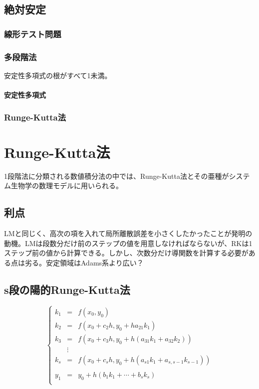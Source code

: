 \subsection{絶対安定}
\subsubsection{線形テスト問題}

\subsubsection{多段階法}
安定性多項式の根がすべて1未満。
\paragraph{安定性多項式}
\subsubsection{Runge-Kutta法}




\section{Runge-Kutta法}
1段階法に分類される数値積分法の中では、Runge-Kutta法とその亜種がシステム生物学の数理モデルに用いられる。
\subsection{利点}
LMと同じく、高次の項を入れて局所離散誤差を小さくしたかったことが発明の動機。LMは段数分だけ前のステップの値を用意しなければならないが、RKは1ステップ前の値から計算できる。しかし、次数分だけ導関数を計算する必要がある点は劣る。安定領域はAdams系より広い？

\subsection{s段の陽的Runge-Kutta法}
\[
\left\{
\begin{array}{lcl}
k_1 & = & f( x_0 , y_0 )\\
k_2 & = & f( x_0 + c_2 h , y_0 + h a_{21}k_1 )\\
k_3 & = & f( x_0 + c_3 h , y_0 + h ( a_{31}k_1 + a_{32} k_2 ))\\
    & \vdots  & \\
k_s & = & f( x_0 + c_s h , y_0 + h ( a_{s1}k_1 + a_{s,s-1} k_{s-1}))\\
 & & \\
y_1 & = & y_0 + h(b_1 k_1 + \cdots + b_s k_s)\\
\end{array}
\right.
\]

